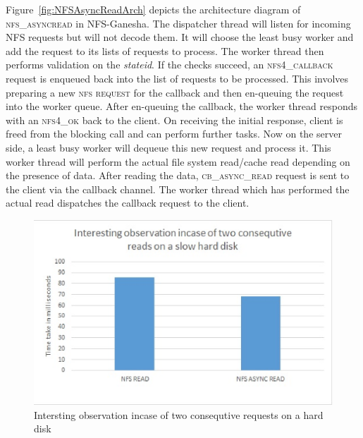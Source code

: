  Figure~\ref{fig:NFSAsyncReadArch} depicts the architecture diagram of \textsc{nfs\_asyncread} in NFS-Ganesha. The dispatcher thread will listen for incoming NFS requests but will not decode them. It will choose the least busy worker and add the request to its lists of requests to process. The worker thread then performs validation on the \textit{stateid}. If  the checks succeed, an \textsc{nfs4\_callback} request is enqueued back into the list of requests to be processed.  This involves preparing a new \textsc{nfs request} for the callback and then en-queuing the request into the worker queue. After en-queuing the callback, the worker thread responds with an \textsc{nfs4\_ok} back to the client. On receiving the initial response, client is freed from the blocking call and can perform further tasks. Now on the server side, a least busy worker will dequeue this new request and process it. This worker thread will perform the actual file system read/cache read depending on the presence of data. After reading the data, \textsc{cb\_async\_read} request is sent to the client via the callback channel. The worker thread which has performed the actual read dispatches the callback request to the client. 
 

\begin{figure}
\centering
\includegraphics[scale=1.0]{figures/InterstingObservation.eps}
\caption{Intersting observation incase of two consequtive requests on a hard disk}
\label{fig:InterstingObservation}
\end{figure}





 
 
 








